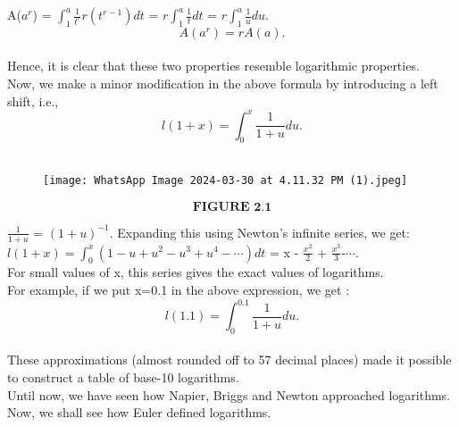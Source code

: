 \documentclass[a4paper,reqno,11pt]{book}
\theoremstyle{plain}%
\theoremstyle{definition}
\begin{document}
A($a^r$) = $\int_{1}^{a}\frac{1}{t^r}r(t^{r-1})dt$ = $r\int_{1}^{a}\frac{1}{t}dt$ = $r\int_{1}^{a}\frac{1}{u}du.$\\
$$\textbf{$A(a^r) = rA(a).$}$$
\\
Hence, it is clear that these two properties resemble logarithmic properties.\\
Now, we make a minor modification in the above formula by introducing a left shift, i.e.,\\
$$\textbf{$l(1+x) = \int_{0}^{x}\frac{1}{1+u}du$.}$$\\
\begin{figure}
   \centering
   \texttt{[image: WhatsApp Image 2024-03-30 at 4.11.32 PM (1).jpeg]}
\end{figure}
$$ \textbf{FIGURE 2.1}$$

$\frac{1}{1+u}$ = $(1+u)^{-1}$. Expanding this using Newton's infinite series, we get:
$l(1+x) = \int_{0}^{x}(1-u+u^2-u^3+u^4-\cdots)dt$ = x - $ \frac{x^2}{2} $ + $\frac{x^3}{3}$-$\cdots.$\\
For small values of x, this series gives the exact values of logarithms.\\
For example, if we put x=0.1 in the above expression, we get :\\
$$\textbf{$l(1.1)=\int_{0}^{0.1}\frac{1}{1+u}du.$}$$\\
These approximations (almost rounded off to 57 decimal places) made it possible to construct a table of base-10 logarithms.\\
Until now, we have seen how Napier, Briggs and Newton approached logarithms.
Now, we shall see how Euler defined logarithms.
\end{document}
